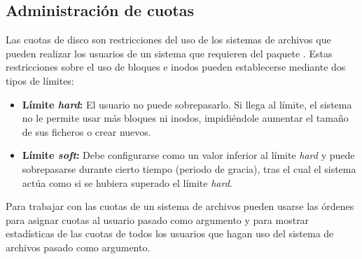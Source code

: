 \subsection{Administración de cuotas}

Las cuotas de disco son restricciones del uso de los sistemas de archivos que pueden realizar los usuarios de un sistema que requieren del paquete .
Estas restricciones sobre el uso de bloques e inodos pueden establecerse mediante dos tipos de límites:

\begin{itemize}
	\item\textbf{Límite \emph{hard}:} El usuario no puede sobrepasarlo. Si llega al límite, el sistema no le permite usar más bloques ni inodos, impidiéndole aumentar el tamaño de sus ficheros o crear nuevos.
	\item\textbf{Límite \emph{soft}:} Debe configurarse como un valor inferior al límite \emph{hard} y puede sobrepasarse durante cierto tiempo (periodo de gracia), tras el cual el sistema actúa como si se hubiera superado el límite \emph{hard}.
\end{itemize}

Para trabajar con las cuotas de un sistema de archivos pueden usarse las órdenes  para asignar cuotas al usuario pasado como argumento y  para mostrar estadísticas de las cuotas de todos los usuarios que hagan uso del sistema de archivos pasado como argumento.


